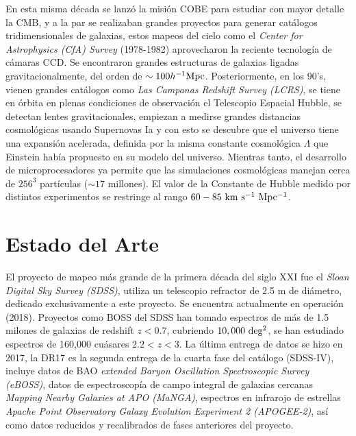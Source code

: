 \documentclass[preprint]{aastex62}
\begin{document}
  En esta misma década se lanzó la misión COBE para estudiar con mayor detalle la CMB,
  y a la par se realizaban grandes proyectos para generar catálogos tridimensionales de
  galaxias, estos mapeos del cielo como el \textit{Center for Astrophysics (CfA) Survey}
  (1978-1982) aprovecharon la reciente tecnología de cámaras CCD. Se encontraron grandes
  estructuras de galaxias ligadas gravitacionalmente, del orden de $\sim 100 h^{-1}\rm Mpc$.
  Posteriormente, en los 90's, vienen grandes catálogos como  \textit{Las Campanas Redshift
    Survey (LCRS)}, se tiene en órbita en plenas condiciones de observación el Telescopio
  Espacial Hubble, se detectan lentes gravitacionales, empiezan a medirse grandes distancias
  cosmológicas usando Supernovas Ia y con esto se descubre que el universo tiene una
  expansión acelerada, definida por la misma constante cosmológica $\Lambda$ que
  Einstein había propuesto en su modelo del universo. Mientras tanto, el desarrollo de
  microprocesadores ya permite que las simulaciones cosmológicas manejan cerca de
  $256^3$ partículas ($\sim 17$ millones). El valor de la Constante de Hubble medido por
  distintos experimentos se restringe al rango  $60-85 \rm~km~s^{-1}~Mpc^{-1}$. \citep{Schneider2014}
  

  \section{Estado del Arte}

  El proyecto de mapeo más grande de la primera década del siglo XXI fue el \textit{Sloan Digital
    Sky Survey (SDSS)},  utiliza un telescopio refractor de 2.5 m de diámetro, dedicado
  exclusivamente a este proyecto. Se encuentra actualmente en operación (2018).
  Proyectos como BOSS del SDSS han tomado espectros de más de 1.5 milones de galaxias de redshift
  $z<0.7$, cubriendo $10,000 \rm~deg^2$, se han estudiado espectros de 160,000 cuásares
  $2.2<z<3$.
  La última entrega de datos se hizo en 2017, la DR17 es la segunda entrega de la cuarta fase del
  catálogo (SDSS-IV), incluye datos de BAO \textit{extended Baryon Oscillation Spectroscopic Survey
    (eBOSS)}, datos de espectroscopía de campo integral de galaxias cercanas \textit{Mapping Nearby
    Galaxies at APO (MaNGA)}, espectros en infrarojo de estrellas \textit{Apache Point Observatory
    Galaxy Evolution Experiment 2 (APOGEE-2)}, así como datos reducidos y recalibrados de fases
  anteriores del proyecto. \citep{SDSS-DR14-2017}

  
  
\end{document}
